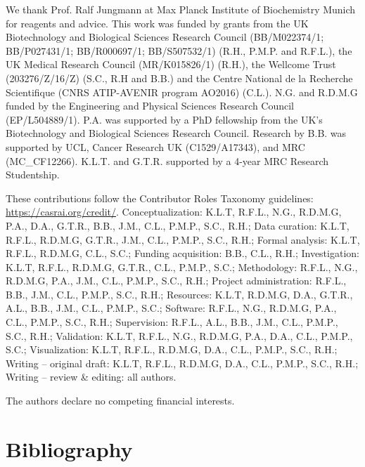 \begin{acknowledgements}
 We thank Prof. Ralf Jungmann at Max Planck Institute of Biochemistry Munich for reagents and advice. This work was funded by grants from the UK Biotechnology and Biological Sciences Research Council (BB/M022374/1; BB/P027431/1; BB/R000697/1; BB/S507532/1) (R.H., P.M.P. and R.F.L.), the UK Medical Research Council (MR/K015826/1) (R.H.), the Wellcome Trust (203276/Z/16/Z) (S.C., R.H and B.B.) and the Centre National de la Recherche Scientifique (CNRS ATIP-AVENIR program AO2016) (C.L.). N.G. and R.D.M.G funded by the Engineering and Physical Sciences Research Council (EP/L504889/1). P.A. was supported by a PhD fellowship from the UK’s Biotechnology and Biological Sciences Research Council. Research by B.B. was supported by UCL, Cancer Research UK (C1529/A17343), and MRC (MC\_CF12266). K.L.T. and G.T.R. supported by a 4-year MRC Research Studentship.
\end{acknowledgements}

\begin{contributions}
 These contributions follow the Contributor Roles Taxonomy guidelines: \href{https://casrai.org/credit/}{https://casrai.org/credit/}.
 Conceptualization: K.L.T, R.F.L., N.G., R.D.M.G, P.A., D.A., G.T.R., B.B., J.M., C.L., P.M.P., S.C., R.H.;
 Data curation: K.L.T, R.F.L., R.D.M.G, G.T.R., J.M., C.L., P.M.P., S.C., R.H.;
 Formal analysis:  K.L.T, R.F.L., R.D.M.G, C.L., S.C.;
 Funding acquisition:  B.B., C.L., R.H.;
 Investigation: K.L.T, R.F.L., R.D.M.G, G.T.R., C.L., P.M.P., S.C.;
 Methodology: R.F.L., N.G., R.D.M.G, P.A., J.M., C.L., P.M.P., S.C., R.H.;
 Project administration: R.F.L., B.B., J.M., C.L., P.M.P., S.C., R.H.;
 Resources: K.L.T, R.D.M.G, D.A., G.T.R., A.L., B.B., J.M., C.L., P.M.P., S.C.;
 Software: R.F.L., N.G., R.D.M.G, P.A., C.L., P.M.P., S.C., R.H.;
 Supervision: R.F.L., A.L., B.B., J.M., C.L., P.M.P., S.C., R.H.;
 Validation: K.L.T, R.F.L., N.G., R.D.M.G, P.A., D.A., C.L., P.M.P., S.C.;
 Visualization:  K.L.T, R.F.L., R.D.M.G, D.A., C.L., P.M.P., S.C., R.H.;
 Writing – original draft: K.L.T, R.F.L., R.D.M.G, D.A., C.L., P.M.P., S.C., R.H.;
 Writing – review \& editing: all authors.

\end{contributions}

\begin{interests}
 The authors declare no competing financial interests.
\end{interests}

\section*{Bibliography}


